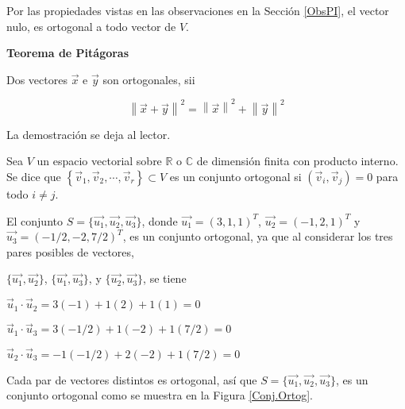 \bigskip

\begin{remark}
Por las propiedades vistas en las  observaciones \textcolor{blue}{{\selectfont{i}}} en la Sección \ref{ObsPI}, el vector nulo,  es ortogonal a todo vector de $V$.
\end{remark}




\begin{corollary}
    
\textbf{Teorema de Pitágoras} 
\label{Pitagoras}


Dos vectores $\vec{x}$ e $\vec{y}$  son ortogonales, sii 

$$\left\|\vec{x}+\vec{y}\right\|^{2}=\left\|\vec{x}\right\|^{2}+\left\|\vec{y}\right\|^{2}$$

\end{corollary}

\bigskip

La demostración se deja al lector.


\bigskip


\begin{definition} 

Sea $V$ un espacio vectorial sobre $\mathbb{R}$ o $\mathbb{C}$ de dimensión finita con producto interno. Se dice que $\left\{\vec{v}_1,\vec{v}_2,\cdots, \vec{v}_r\right\}\subset V$ es un conjunto ortogonal si $(\vec{v}_i,\vec{v}_j)=0$ para todo $i\neq j$. \end{definition}

\bigskip

\begin{example}
 \label{eju1u2u3}   

El conjunto  $S=\{\vec{u_1}, \vec{u_2}, \vec{u_3}\}$, 
donde $\vec{u_1}=(3,1,1)^T$, $\vec{u_2}=(-1,2,1)^T$ y $\vec{u_3}=(-1/2,-2,7/2)^T$,
es un conjunto ortogonal, ya que al considerar los tres pares posibles de vectores, 

\bigskip

$\{\vec{u_1}, \vec{u_2}\}$, $\{\vec{u_1},\vec{u_3}\}$, y $\{\vec{u_2}, \vec{u_3}\}$, se tiene 

 \bigskip 

$\vec{u}_1 \cdot \vec{u}_2= 3(−1) + 1(2) + 1(1)= 0$

\bigskip

$\vec{u}_1 \cdot \vec{u}_3= 3(−1/2) + 1(-2) + 1(7/2)= 0$

\bigskip

$\vec{u}_2 \cdot \vec{u}_3= -1(−1/2) + 2(-2) + 1(7/2)= 0$

\bigskip



Cada par de vectores distintos es ortogonal, así que $S=\{\vec{u_1}, \vec{u_2}, \vec{u_3}\}$, es un conjunto ortogonal como se muestra  en  la Figura \ref{Conj.Ortog}. 
\end{example}



